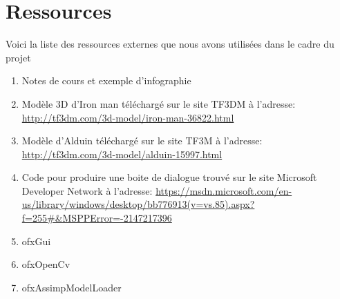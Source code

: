 \chapter{Ressources}
\label{s:ressources}

Voici la liste des ressources externes que nous avons utilisées dans le cadre du projet
\begin{enumerate}
	\item Notes de cours et exemple d'infographie 
	\item Modèle 3D d'Iron man téléchargé sur le site TF3DM à l'adresse:  \url{http://tf3dm.com/3d-model/iron-man-36822.html}
	\item Modèle d'Alduin téléchargé sur le site TF3M à l'adresse: 
	\url{http://tf3dm.com/3d-model/alduin-15997.html}
	\item Code pour produire une boite de dialogue trouvé sur le site Microsoft Developer Network à l'adresse: \url{https://msdn.microsoft.com/en-us/library/windows/desktop/bb776913(v=vs.85).aspx?f=255#\&MSPPError=-2147217396}
	\item ofxGui
	\item ofxOpenCv
	\item ofxAssimpModelLoader
\end{enumerate}